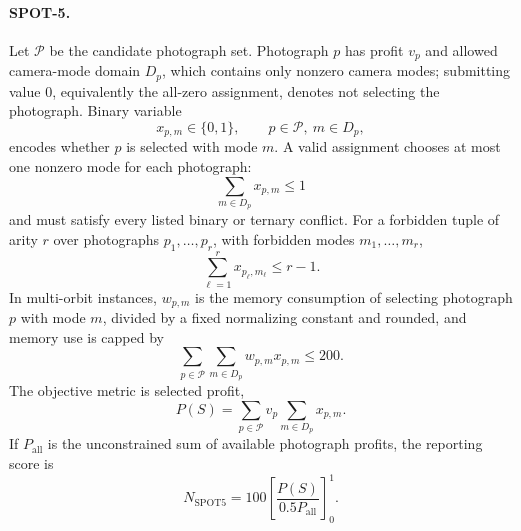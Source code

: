 \documentclass[11pt]{article}
\begin{document}
\paragraph{SPOT-5.} Let \(\mathcal{P}\) be the candidate photograph set. Photograph \(p\) has profit \(v_p\) and allowed camera-mode domain \(D_p\), which contains only nonzero camera modes; submitting value \(0\), equivalently the all-zero assignment, denotes not selecting the photograph. Binary variable
\[
  x_{p,m}\in\{0,1\},\qquad p\in\mathcal{P},\ m\in D_p,
\]
encodes whether \(p\) is selected with mode \(m\). A valid assignment chooses at most one nonzero mode for each photograph:
\[
  \sum_{m\in D_p}x_{p,m}\le 1
\]
and must satisfy every listed binary or ternary conflict. For a forbidden tuple of arity \(r\) over photographs \(p_1,\ldots,p_r\), with forbidden modes \(m_1,\ldots,m_r\),
\[
  \sum_{\ell=1}^{r}x_{p_\ell,m_\ell}\le r-1.
\]
In multi-orbit instances, \(w_{p,m}\) is the memory consumption of selecting photograph \(p\) with mode \(m\), divided by a fixed normalizing constant and rounded, and memory use is capped by
\[
  \sum_{p\in\mathcal{P}}\sum_{m\in D_p} w_{p,m}x_{p,m}\le 200.
\]
The objective metric is selected profit,
\[
  P(S)=\sum_{p\in\mathcal{P}}v_p\sum_{m\in D_p}x_{p,m}.
\]
If \(P_{\mathrm{all}}\) is the unconstrained sum of available photograph profits, the reporting score is
\[
  N_{\mathrm{SPOT5}}=100\left[\frac{P(S)}{0.5P_{\mathrm{all}}}\right]_0^1.
\]
\end{document}
